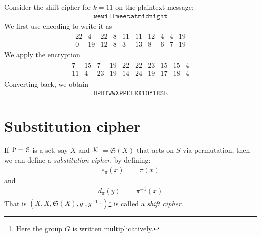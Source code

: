 \documentclass[a4paper, 12pt]{book} %
\begin{document}
\begin{example}
    Consider the shift cipher for $k = 11$ on the plaintext message:
    \begin{align}
        \texttt{wewillmeetatmidnight}
    \end{align}
    We first use encoding to write it as
    \begin{align}
        \begin{array}{cccccccccc}
            22 & 4 & 22 & 8 & 11 & 11 & 12 & 4 & 4 & 19 \\
            0 & 19 & 12 & 8 & 3 & 13 & 8 & 6 & 7 & 19
        \end{array}
    \end{align}
    We apply the encryption
    \begin{align}
        \begin{array}{cccccccccc}
            7 & 15 & 7 & 19 & 22 & 22 & 23 & 15 & 15 & 4 \\
            11 & 4 & 23 & 19 & 14 & 24 & 19 & 17 & 18 & 4
        \end{array}
    \end{align}
    Converting back, we obtain
    \begin{align}
        \texttt{HPHTWWXPPELEXTOYTRSE}
    \end{align}

\end{example}



\chapter{Substitution cipher}

\begin{definition}
    If $\EuScript{P} = \EuScript{C}$ is a set, say $X$ and $\EuScript{K}$ $= \mathfrak{S}(X)$ that acts on $S$ via permutation, then we can define a \emph{substitution cipher}, by defining:
    \begin{align}
        e_\pi(x) &= \pi(x) 
    \end{align}
    and
    \begin{align}
        d_\pi(y) &= \pi^{-1}(x) 
    \end{align}
    That is $(X, X, \mathfrak{S}(X), g \cdot, g^{-1} \cdot)$\footnote{Here the group $G$ is written multiplicatively.} is called a \emph{shift cipher}.

\end{definition}
\end{document}
